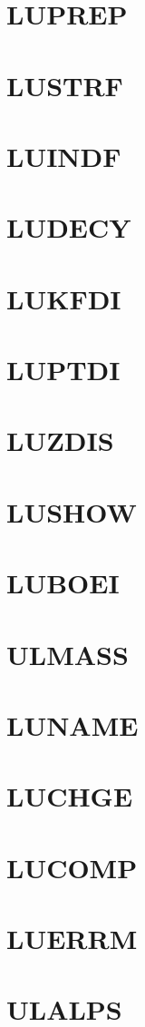\documentclass[10pt,UTF8]{ctexbook}
\begin{document}
\section{LUPREP}
\section{LUSTRF}
\section{LUINDF}
\section{LUDECY}
\section{LUKFDI}
\section{LUPTDI}
\section{LUZDIS}
\section{LUSHOW}
\section{LUBOEI}
\section{ULMASS}
\section{LUNAME}
\section{LUCHGE}
\section{LUCOMP}
\section{LUERRM}
\section{ULALPS}
\end{document}
